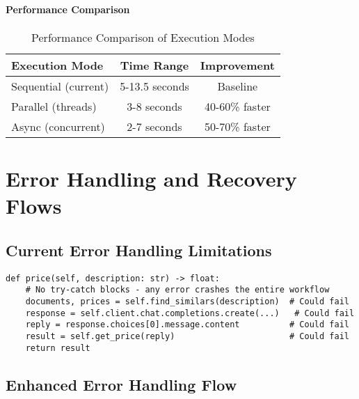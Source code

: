 \paragraph{Performance Comparison}
\begin{table}[htbp]
\centering
\begin{tabular}{@{}lcc@{}}
\toprule
\textbf{Execution Mode} & \textbf{Time Range} & \textbf{Improvement} \\
\midrule
Sequential (current) & 5-13.5 seconds & Baseline \\
Parallel (threads) & 3-8 seconds & 40-60\% faster \\
Async (concurrent) & 2-7 seconds & 50-70\% faster \\
\bottomrule
\end{tabular}
\caption{Performance Comparison of Execution Modes}
\label{tab:performance_comparison}
\end{table}

\section{Error Handling and Recovery Flows}

\subsection{Current Error Handling Limitations}

\begin{lstlisting}[caption=Current Error Handling Issues]
def price(self, description: str) -> float:
    # No try-catch blocks - any error crashes the entire workflow
    documents, prices = self.find_similars(description)  # Could fail
    response = self.client.chat.completions.create(...)   # Could fail
    reply = response.choices[0].message.content          # Could fail
    result = self.get_price(reply)                       # Could fail
    return result
\end{lstlisting}

\subsection{Enhanced Error Handling Flow}

